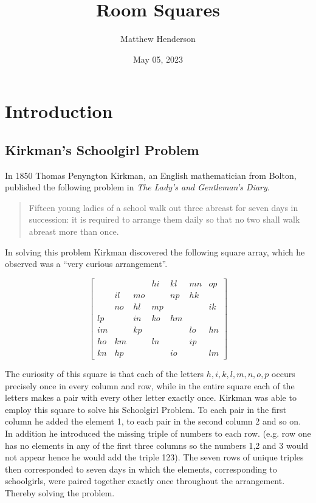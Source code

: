 \documentclass[11pt, a4paper]{book}\usepackage[]{graphicx}\usepackage[]{xcolor}
\title{Room Squares}
\author{Matthew Henderson}
\date{May 05, 2023}
\begin{document}
\frontmatter
\maketitle
\tableofcontents

\mainmatter


\chapter{Introduction}

\section{Kirkman’s Schoolgirl Problem}

In 1850 Thomas Penyngton Kirkman, an English mathematician from Bolton, published the following problem in \emph{The Lady’s and Gentleman’s Diary}.

\begin{quotation}
Fifteen young ladies of a school walk out three abreast for seven days in succession: it is required to arrange them daily so that no two shall walk abreast more than once.
\end{quotation}

In solving this problem Kirkman discovered the following square array, which he observed was a ``very curious arrangement''.

\begin{equation}
  \begin{bmatrix}
       &    &    & hi & kl & mn & op \\
       & il & mo &    & np & hk &    \\
       & no & hl & mp &    &    & ik \\
    lp &    & in & ko & hm &    &    \\
    im &    & kp &    &    & lo & hn \\
    ho & km &    & ln &    & ip &    \\
    kn & hp &    &    & io &    & lm 
  \end{bmatrix}
  \label{eq:roomsquare}
\end{equation}

The curiosity of this square is that each of the letters
$h, i, k, l, m, n, o, p$
occurs precisely once in every column and row, while in the entire square each of the letters makes a pair with every other letter exactly once.
Kirkman was able to employ this square to solve his Schoolgirl Problem.
To each pair in the first column he added the element 1, to each pair in the second column 2 and so on.
In addition he introduced the missing triple of numbers to each row.
(e.g. row one has no elements in any of the first three columns so the numbers 1,2 and 3 would not appear hence he would add the triple 123).
The seven rows of unique triples then corresponded to seven days in which the elements, corresponding to schoolgirls, were paired together exactly once throughout the arrangement.
Thereby solving the problem.
\end{document}
